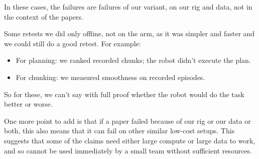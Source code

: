 \documentclass[10pt,twocolumn]{article}
\begin{document}
In these cases, the failures are failures of our variant, on our rig and data, not in the context of the papers.


Some retests we did only offline, not on the arm, as it was simpler and faster and we could still do a good retest. For example:


\begin{itemize}\setlength{\itemsep}{0pt}\setlength{\parskip}{0pt}\footnotesize
\item For planning: we ranked recorded chunks; the robot didn't execute the plan.
\item For chunking: we measured smoothness on recorded episodes.
\end{itemize}


So for these, we can't say with full proof whether the robot would do the task better or worse.


One more point to add is that if a paper failed because of our rig or our data or both, this also means that it can fail on other similar low-cost setups. This suggests that some of the claims need either large compute or large data to work, and so cannot be used immediately by a small team without sufficient resources.
\end{document}
